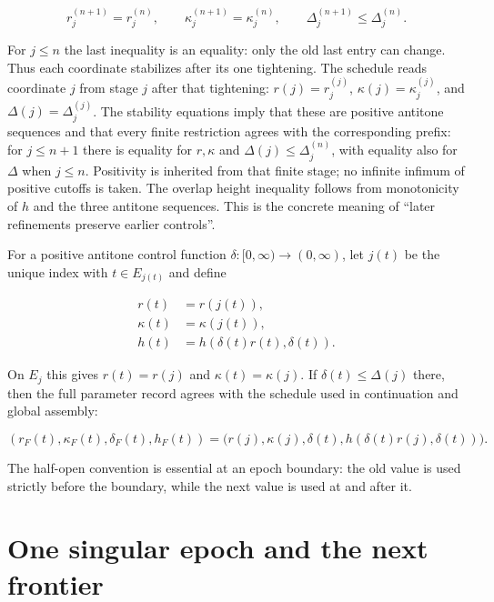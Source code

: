 \begin{equation}
 r_j^{(n+1)}=r_j^{(n)},\qquad
 \kappa_j^{(n+1)}=\kappa_j^{(n)},\qquad
\Delta_j^{(n+1)}\leq\Delta_j^{(n)}.
 \label{eq:global-stability}
\end{equation}

For $j\leq n$ the last inequality is an equality: only the old last
entry can change. Thus each coordinate stabilizes after its one tightening.
The schedule reads coordinate $j$ from stage $j$ after that tightening:
$r(j)=r_j^{(j)}$, $\kappa(j)=\kappa_j^{(j)}$, and
$\Delta(j)=\Delta_j^{(j)}$.  The stability equations imply that these are
positive antitone sequences and that every finite restriction agrees with the
corresponding prefix: for $j\leq n+1$ there is equality for $r,\kappa$
and $\Delta(j)\leq\Delta_j^{(n)}$, with equality also for $\Delta$ when
$j\leq n$. Positivity is inherited from that finite stage; no infinite
infimum of positive cutoffs is taken. The overlap height inequality follows from
monotonicity of $h$ and the three antitone sequences.  This is the concrete
meaning of ``later refinements preserve earlier controls''.

For a positive antitone control function $\delta:[0,\infty)\to(0,\infty)$,
let $j(t)$ be the unique index with $t\in E_{j(t)}$ and define

\begin{align}
 r(t)&=r(j(t)),\\
 \kappa(t)&=\kappa(j(t)),\\
 h(t)&=h(\delta(t)r(t),\delta(t)).
 \end{align}

On $E_j$ this gives $r(t)=r(j)$ and $\kappa(t)=\kappa(j)$.
If $\delta(t)\leq\Delta(j)$ there, then the full parameter record agrees
with the schedule used in continuation and global assembly:

\begin{equation}
 (r_F(t),\kappa_F(t),\delta_F(t),h_F(t))
 =\bigl(r(j),\kappa(j),\delta(t),h(\delta(t)r(j),\delta(t))\bigr).
 \label{eq:global-profile}
\end{equation}

The half-open convention is essential at an epoch boundary: the old value is
used strictly before the boundary, while the next value is used at and
after it.

\section{One singular epoch and the next frontier}
\label{sec:global-epoch}

